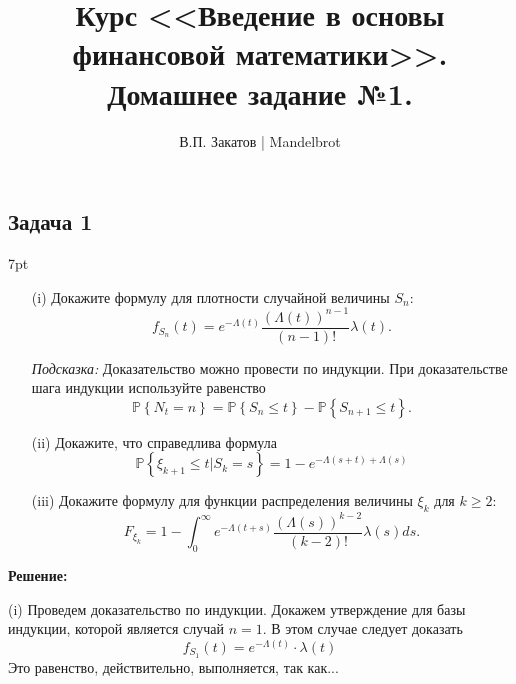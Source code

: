 \documentclass[a4paper,12pt]{article}
\title{Курс <<Введение в основы финансовой математики>>.\\Домашнее задание №1.}
\date{}
\author{В.П. Закатов | Mandelbrot}
\newenvironment{formal}{%
	\def\FrameCommand{%
		\hspace{1pt}%
		{\color{black}\vrule width 1.5pt}%
		{\color{white}\vrule width 4pt}%
		\colorbox{white}%
	}%
	\MakeFramed{\advance\hsize-\width\FrameRestore}%
	\noindent\hspace{-4.55pt}%
	\begin{adjustwidth}{}{7pt}%
		\vspace{2pt}\vspace{2pt}%
	}
	{%
		\vspace{2pt}\end{adjustwidth}\endMakeFramed%
}
\begin{document}
\maketitle
\subsection*{Задача 1}
\begin{formal}
\begin{itemize}
	\item[(i)] Докажите формулу для плотности случайной величины $S_n$:
	$$
	f_{S_n}(t) = e^{-\Lambda(t)}\dfrac{(\Lambda(t))^{n-1}}{(n-1)!}\lambda(t).
	$$
	
	\textit{Подсказка:} Доказательство можно провести по индукции. При доказательстве шага индукции используйте равенство
	$$
	\mathbb{P}\left\{N_t = n\right\} = \mathbb{P}\left\{S_n \leq t\right\} - \mathbb{P}\left\{S_{n+1}\leq t \right\}.
	$$
	\item[(ii)] Докажите, что справедлива формула
	$$
	\mathbb{P}\left\{\xi_{k+1}\leq t | S_k = s \right\} = 1 - e^{-\Lambda(s+t) + \Lambda(s)}
	$$
	\item[(iii)] Докажите формулу для функции распределения величины $\xi_k$ для $k\geq 2$:
	$$
	F_{\xi_k} = 1 - \int_{0}^{\infty} e^{-\Lambda(t+s)}\dfrac{(\Lambda(s))^{k-2}}{(k-2)!}\lambda(s)ds.
	$$
\end{itemize}
\end{formal}
\textbf{\large Решение:}

(i) Проведем доказательство по индукции. Докажем утверждение для базы индукции, которой является случай $n = 1$. В этом случае следует доказать
$$
f_{S_1}(t) = e^{-\Lambda(t)}\cdot \lambda(t)
$$
Это равенство, действительно, выполняется, так как...
\end{document}
